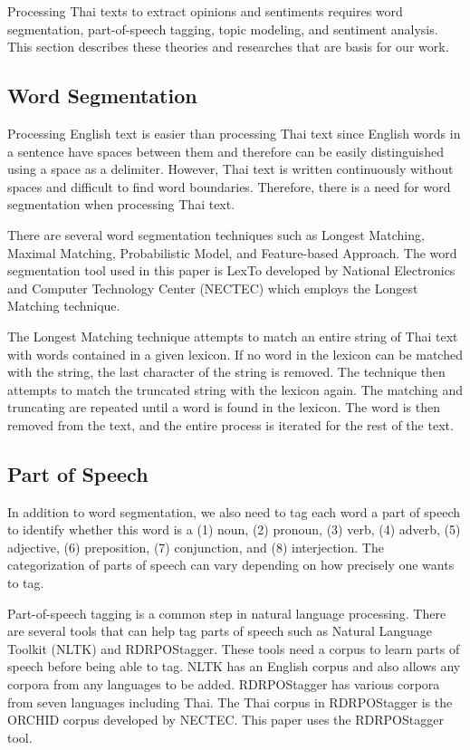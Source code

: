 Processing Thai texts to extract opinions and sentiments requires word segmentation, part-of-speech tagging, topic modeling, and sentiment analysis. This section describes these theories and researches that are basis for our work. 

\subsection{Word Segmentation}

Processing English text is easier than processing Thai text since English words in a sentence have spaces between them and therefore can be easily distinguished using a space as a delimiter. However, Thai text is written continuously without spaces and difficult to find word boundaries. Therefore, there is a need for word segmentation when processing Thai text.

There are several word segmentation techniques such as Longest Matching\cite{syllableseparator}, Maximal Matching\cite{wordsegforthai}, Probabilistic Model\cite{thaiwordfilter}, and Feature-based Approach\cite{featurethaiwordseg}. The word segmentation tool used in this paper is LexTo\cite{LexTo} developed by National Electronics and Computer Technology Center (NECTEC) which employs the Longest Matching technique. 

The Longest Matching technique attempts to match an entire string of Thai text with words contained in a given lexicon. If no word in the lexicon can be matched with the string, the last character of the string is removed. The technique then attempts to match the truncated string with the lexicon again. The matching and truncating are repeated until a word is found in the lexicon. The word is then removed from the text, 
and the entire process is iterated for the rest of the text.

\subsection{Part of Speech}

In addition to word segmentation, we also need to tag each word a part of speech to identify whether this word is a (1) noun, (2) pronoun, (3) verb, (4) adverb, (5) adjective, (6) preposition, (7) conjunction, and (8) interjection. The categorization of parts of speech can vary depending on how precisely one wants to tag.

Part-of-speech tagging is a common step in natural language processing. There are several tools that can help tag parts of speech such as Natural Language Toolkit (NLTK)\cite{NLTK} and RDRPOStagger\cite{RDRPOSTagger}. These tools need a corpus to learn parts of speech before being able to tag. NLTK has an English corpus and also allows any corpora from any languages to be added. RDRPOStagger has various corpora from seven languages including Thai. The Thai corpus in RDRPOStagger is the ORCHID\cite{ORCHID} corpus developed by NECTEC. This paper uses the RDRPOStagger tool.

